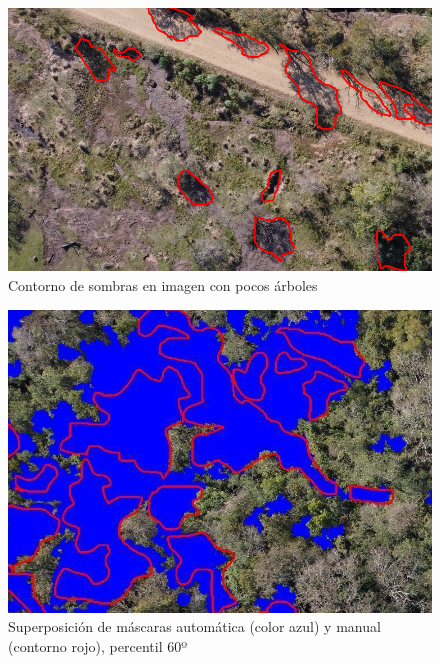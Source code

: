 \begin{figure}[H]
    \includegraphics[width=\textwidth]{Imagenes/contours2.png}
     \hfill
     \caption{Contorno de sombras en imagen con pocos árboles}
    \label{contorno2}
\end{figure}

\begin{figure}[H]
     
         \includegraphics[width=\textwidth]{Imagenes/superposition of masks.png}
         \caption{Superposición de máscaras automática (color azul) y manual (contorno rojo), percentil 60º}
         \label{p60}
\end{figure}
     \hfill
     
